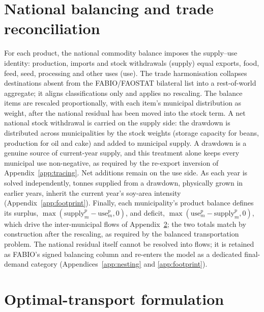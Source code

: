 \section{National balancing and trade reconciliation}\label{app:balancing}
For each product, the national commodity balance imposes the supply--use
identity: production, imports and stock withdrawals (supply) equal
exports, food, feed, seed, processing and other uses (use). The trade
harmonisation collapses destinations absent from the FABIO/FAOSTAT
bilateral list into a rest-of-world aggregate; it aligns
classifications only and applies no rescaling. The balance items are
rescaled proportionally, with each item's municipal distribution as
weight, after the national residual has been moved into the stock
term. A net national stock withdrawal is carried on the supply side:
the drawdown is distributed across municipalities by the stock weights
(storage capacity for beans, production for oil and cake) and added to
municipal supply. A drawdown is a genuine source of current-year
supply, and this treatment alone keeps every municipal use
non-negative, as required by the re-export inversion of
Appendix~\ref{app:tracing}. Net additions remain on the use side. As
each year is solved independently, tonnes supplied from a drawdown,
physically grown in earlier years, inherit the current year's soy-area
intensity (Appendix~\ref{app:footprint}). Finally, each municipality's
product balance defines its surplus,
$\max(\text{supply}^p_m-\text{use}^p_m,0)$, and deficit,
$\max(\text{use}^p_m-\text{supply}^p_m,0)$, which drive the
inter-municipal flows of Appendix~\ref{app:transport}; the two totals
match by construction after the rescaling, as required by the balanced
transportation problem. The national residual itself cannot be
resolved into flows; it is retained as FABIO's signed balancing column
and re-enters the model as a dedicated final-demand category
(Appendices~\ref{app:nesting} and \ref{app:footprint}).

\section{Optimal-transport formulation}\label{app:transport}

